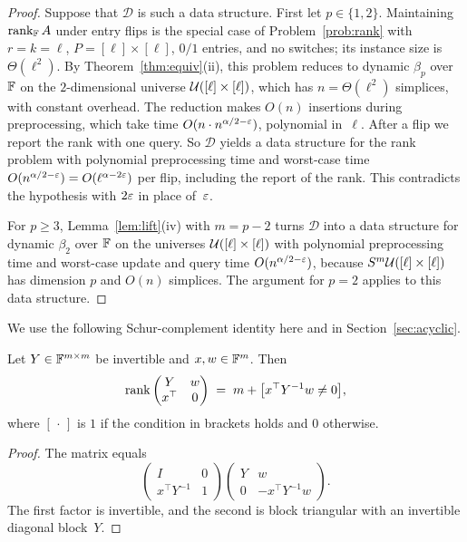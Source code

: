 \begin{proof}
Suppose that $\mathcal{D}$ is such a data structure.
First let $p\in\{1,2\}$.
Maintaining $\operatorname{rank}_{\mathbb{F}}A$ under entry flips is the special case of Problem~\ref{prob:rank} with $r=k=\ell$, $P=[\ell]\times[\ell]$, $0/1$ entries, and no switches; its instance size is $\Theta(\ell^2)$.
By Theorem~\ref{thm:equiv}(ii), this problem reduces to dynamic $\beta_p$ over $\mathbb{F}$ on the $2$-dimensional universe $\mathcal{U}([\ell]\times[\ell])$, which has $n=\Theta(\ell^2)$ simplices, with constant overhead.
The reduction makes $O(n)$ insertions during preprocessing, which take time $O(n\cdot n^{\alpha/2-\varepsilon})$, polynomial in~$\ell$.
After a flip we report the rank with one query.
So $\mathcal{D}$ yields a data structure for the rank problem with polynomial preprocessing time and worst-case time $O(n^{\alpha/2-\varepsilon})=O(\ell^{\alpha-2\varepsilon})$ per flip, including the report of the rank.
This contradicts the hypothesis with $2\varepsilon$ in place of~$\varepsilon$.

For $p\ge3$, Lemma~\ref{lem:lift}(iv) with $m=p-2$ turns $\mathcal{D}$ into a data structure for dynamic $\beta_2$ over $\mathbb{F}$ on the universes $\mathcal{U}([\ell]\times[\ell])$ with polynomial preprocessing time and worst-case update and query time $O(n^{\alpha/2-\varepsilon})$, because $S^{m}\mathcal{U}([\ell]\times[\ell])$ has dimension $p$ and $O(n)$ simplices.
The argument for $p=2$ applies to this data structure.
\end{proof}

We use the following Schur-complement identity here and in Section~\ref{sec:acyclic}.
\begin{lemma}\label{lem:bordered}
Let $Y\in\mathbb{F}^{m\times m}$ be invertible and $x,w\in\mathbb{F}^m$. Then
\[
  \operatorname{rank}\begin{pmatrix}Y&w\\x^{\top}&0\end{pmatrix}\;=\;m+\bigl[x^{\top}Y^{-1}w\neq0\bigr],
\]
where $[\,\cdot\,]$ is $1$ if the condition in brackets holds and $0$ otherwise.
\end{lemma}
\begin{proof}
The matrix equals \[\begin{pmatrix}I&0\\x^{\top}Y^{-1}&1\end{pmatrix}\begin{pmatrix}Y&w\\0&-x^{\top}Y^{-1}w\end{pmatrix}.\]
The first factor is invertible, and the second is block triangular with an invertible diagonal block~$Y$.
\end{proof}

